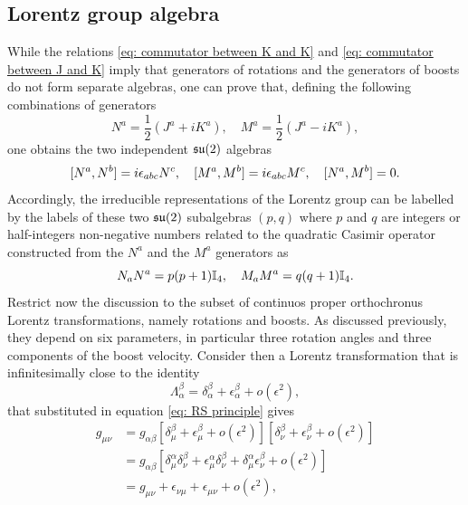 \subsection{Lorentz group algebra}
While the relations \eqref{eq: commutator between K and K} and \eqref{eq: commutator between J and K} imply that generators of rotations and the generators of boosts do not form separate algebras, one can prove that, defining the following combinations of generators 
\begin{equation}
    N^a = \frac{1}{2}(J^a + iK^a),\quad M^a = \frac{1}{2}(J^a - iK^a),
\end{equation}
one obtains the two independent $\mathfrak{su}(2)$ algebras
\begin{equation}
    [N^a,N^b] = i\epsilon_{abc}N^c,\quad [M^a,M^b] = i\epsilon_{abc}M^c,\quad [N^a,M^b] = 0.
\end{equation}
Accordingly, the irreducible representations of the Lorentz group can be labelled by the labels of these two $\mathfrak{su}(2)$ subalgebras $(p,q)$ where $p$ and $q$ are integers or half-integers non-negative numbers related to the quadratic Casimir operator constructed from the $N^a$ and the $M^a$ generators as
\begin{equation}
    N_aN^a = p(p + 1)\mathbb{I}_4,\quad M_aM^a = q(q + 1)\mathbb{I}_4.
\end{equation}
Restrict now the discussion to the subset of continuos proper orthochronus Lorentz transformations, namely rotations and boosts. As discussed previously, they depend on six parameters, in particular three rotation angles and three components of the boost velocity. Consider then a Lorentz transformation that is infinitesimally close to the identity
\begin{equation}
\label{eq: infinitesimal Lorentz transformation}
    \Lambda^\beta_\alpha = \delta^\beta_\alpha + \epsilon^\beta_\alpha + o(\epsilon^2),
\end{equation}
that substituted in equation \eqref{eq: RS principle} gives
\begin{equation}
    \begin{split}
        g_{\mu\nu} &= g_{\alpha\beta}[\delta^\beta_\mu + \epsilon^\beta_\mu + o(\epsilon^2)][\delta^\beta_\nu + \epsilon^\beta_\nu + o(\epsilon^2)] \\
        &= g_{\alpha\beta}[\delta^\alpha_\mu\delta^\beta_\nu + \epsilon^\alpha_\mu\delta^\beta_\nu + \delta^\alpha_\mu\epsilon^\beta_\nu + o(\epsilon^2)] \\
        &= g_{\mu\nu} + \epsilon_{\nu\mu} + \epsilon_{\mu\nu} + o(\epsilon^2),
    \end{split}
\end{equation}
